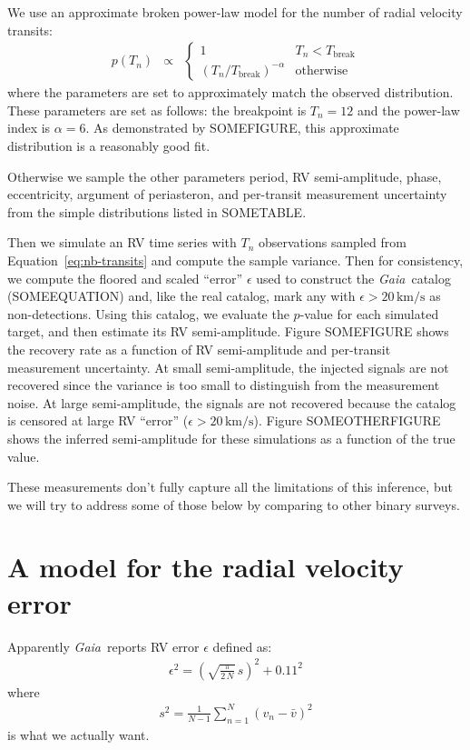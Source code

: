 \documentclass[modern, letterpaper]{aastex63}
\newcommand{\project}[1]{\textsl{#1}}
\newcommand{\Gaia}{\project{Gaia}}
\begin{document}
We use an approximate broken power-law model for the number of radial velocity transits:
\begin{eqnarray}
  \label{eq:nb-transits}
  p(T_n) &\propto& \left\{\begin{array}{ll}
    1                                  & T_n < T_\mathrm{break} \\
    (T_n / T_\mathrm{break})^{-\alpha} & \mathrm{otherwise}
  \end{array} \right.
\end{eqnarray}
where the parameters are set to approximately match the observed distribution.
These parameters are set as follows: the breakpoint is $T_n = 12$ and the power-law index is $\alpha = 6$.
As demonstrated by SOMEFIGURE, this approximate distribution is a reasonably good fit.

Otherwise we sample the other parameters period, RV semi-amplitude, phase, eccentricity, argument of periasteron, and per-transit measurement uncertainty from the simple distributions listed in SOMETABLE.

Then we simulate an RV time series with $T_n$ observations sampled from Equation~\ref{eq:nb-transits} and compute the sample variance.
Then for consistency, we compute the floored and scaled ``error'' $\epsilon$ used to construct the \Gaia\ catalog (SOMEEQUATION) and, like the real catalog, mark any with $\epsilon > 20\,\mathrm{km/s}$ as non-detections.
Using this catalog, we evaluate the $p$-value for each simulated target, and then estimate its RV semi-amplitude.
Figure SOMEFIGURE shows the recovery rate as a function of RV semi-amplitude and per-transit measurement uncertainty.
At small semi-amplitude, the injected signals are not recovered since the variance is too small to distinguish from the measurement noise.
At large semi-amplitude, the signals are not recovered because the catalog is censored at large RV ``error'' ($\epsilon > 20\,\mathrm{km/s}$).
Figure SOMEOTHERFIGURE shows the inferred semi-amplitude for these simulations as a function of the true value.

These measurements don't fully capture all the limitations of this inference, but we will try to address some of those below by comparing to other binary surveys.

\section{A model for the radial velocity error}

Apparently \Gaia\ reports RV error $\epsilon$ defined as:
\begin{eqnarray}
  \epsilon^2 = \left(\sqrt{\frac{\pi}{2\,N}}\,s\right)^2 + 0.11^2
\end{eqnarray}
where
\begin{eqnarray}
  s^2 = \frac{1}{N-1}\sum_{n=1}^N \left(v_n - \bar{v}\right)^2
\end{eqnarray}
is what we actually want.
\end{document}
